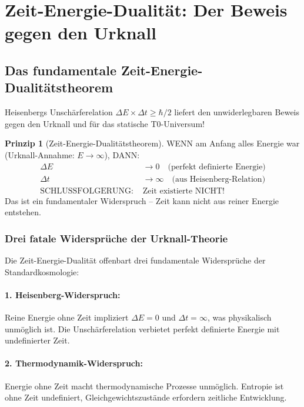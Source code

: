 \documentclass[12pt,a4paper]{article}
\theoremstyle{definition}
\newtheorem{principle}{Prinzip}
\begin{document}
	\section{Zeit-Energie-Dualität: Der Beweis gegen den Urknall}
	
	\subsection{Das fundamentale Zeit-Energie-Dualitätstheorem}
	
	\begin{revolutionary}
		Heisenbergs Unschärferelation $\Delta E \times \Delta t \geq \hbar/2$ liefert den unwiderlegbaren Beweis gegen den Urknall und für das statische T0-Universum!
	\end{revolutionary}
	
	\begin{principle}[Zeit-Energie-Dualitätstheorem]
		WENN am Anfang alles Energie war (Urknall-Annahme: $E \rightarrow \infty$), DANN:
		\begin{align}
			\Delta E &\rightarrow 0 \quad \text{(perfekt definierte Energie)} \\
			\Delta t &\rightarrow \infty \quad \text{(aus Heisenberg-Relation)} \\
			\text{SCHLUSSFOLGERUNG: } &\text{Zeit existierte NICHT!}
		\end{align}
		Das ist ein fundamentaler Widerspruch -- Zeit kann nicht aus reiner Energie entstehen.
	\end{principle}
	
	\subsubsection{Drei fatale Widersprüche der Urknall-Theorie}
	
	\begin{important}
		Die Zeit-Energie-Dualität offenbart drei fundamentale Widersprüche der Standardkosmologie:
	\end{important}
	
	\paragraph{1. Heisenberg-Widerspruch:}
	Reine Energie ohne Zeit impliziert $\Delta E = 0$ und $\Delta t = \infty$, was physikalisch unmöglich ist. Die Unschärferelation verbietet perfekt definierte Energie mit undefinierter Zeit.
	
	\paragraph{2. Thermodynamik-Widerspruch:}
	Energie ohne Zeit macht thermodynamische Prozesse unmöglich. Entropie ist ohne Zeit undefiniert, Gleichgewichtszustände erfordern zeitliche Entwicklung.
	
\end{document}
